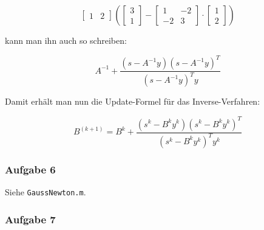 \documentclass[a4paper, 12pt]{report}
\begin{document}
$$\begin{bmatrix}1 & 2\end{bmatrix}\left(\begin{bmatrix}3\\1\end{bmatrix} - \begin{bmatrix}1 & -2\\-2 & 3\end{bmatrix}\cdot\begin{bmatrix}1\\2\end{bmatrix}\right)$$

kann man ihn auch so schreiben:

$$ A^{-1} + \frac{ (s - A^{-1}y )(s - A^{-1}y)^T }{ (s - A^{-1}y)^Ty } $$

Damit erhält man nun die Update-Formel für das Inverse-Verfahren:

$$B^{(k+1)} = B^{k} + \frac{(s^k - B^ky^k)(s^k - B^ky^k)^T}{(s^k-B^ky^k)^Ty^k}$$

\subsubsection{Aufgabe 6}

Siehe \lstinline[basicstyle=\ttfamily\color{black}]|GaussNewton.m|.

\subsubsection{Aufgabe 7}
\end{document}
